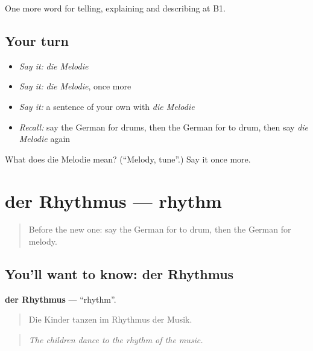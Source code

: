 \begin{grammarlens}[title={What you've built}]
One more word for telling, explaining and describing at B1.
\end{grammarlens}

\subsection*{Your turn}
\begin{itemize}
\raggedright
  \item \emph{Say it:} \emph{die Melodie}
  \item \emph{Say it:} \emph{die Melodie}, once more
  \item \emph{Say it:} a sentence of your own with \emph{die Melodie}
  \item \emph{Recall:} say the German for drums, then the German for to drum, then say \emph{die Melodie} again
\end{itemize}

\begin{tcolorbox}[breakable,colback=teal!4,colframe=teal!35!black,title={Before you move on}]
What does die Melodie mean? (\textquotedblleft{}Melody, tune\textquotedblright{}.) Say it once more.
\end{tcolorbox}
\section[der Rhythmus]{der Rhythmus — rhythm}

\label{lesson:GE-C514-rhythmus}



\begin{quote}
Before the new one: say the German for to drum, then the German for melody.
\end{quote}

\subsection*{You'll want to know: der Rhythmus}
\textbf{der Rhythmus} — \textquotedblleft{}rhythm\textquotedblright{}.

\begin{quote}
Die Kinder tanzen im Rhythmus der Musik.
\end{quote}

\begin{quote}
\emph{The children dance to the rhythm of the music.}
\end{quote}

